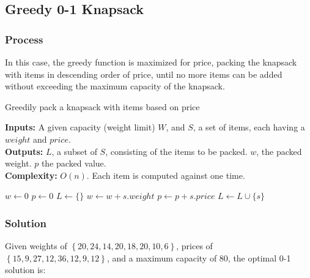 \subsection*{Greedy 0-1 Knapsack}
\subsubsection*{Process}

In this case, the greedy function is maximized for price, packing the knapsack with items in descending order of price, until no more items can be added without exceeding the maximum capacity of the knapsack.

\begin{algorithm}[H]
\caption{Greedily pack a knapsack with items based on price}
\textbf{Inputs:} A given capacity (weight limit) $W$, and $S$, a set of items, each having a $weight$ and $price$. \\
\textbf{Outputs:} $L$, a subset of $S$, consisting of the items to be packed. $w$, the packed weight. $p$ the packed value. \\
\textbf{Complexity:} $O(n)$. Each item is computed against one time. \\[-0.8em]
\hline
\begin{algorithmic}[1]
  \State {} 
  \State $w \leftarrow 0$ 
  \State $p \leftarrow 0$ 
  \State $L \leftarrow \{\}$
     
      \State $w \leftarrow w + s.weight$ 
      \State $p \leftarrow p + s.price$ 
      \State $L \leftarrow L\cup\{s\}$ 
    \EndIf
  \EndFor
\end{algorithmic}
\end{algorithm}

\subsubsection*{Solution}

Given weights of $\left\{ 20, 24, 14, 20, 18, 20, 10, 6 \right\}$, prices of $\left\{ 15, 9, 27, 12, 36, 12, 9, 12 \right\}$, and a maximum capacity of $80$, the optimal 0-1 solution is:

